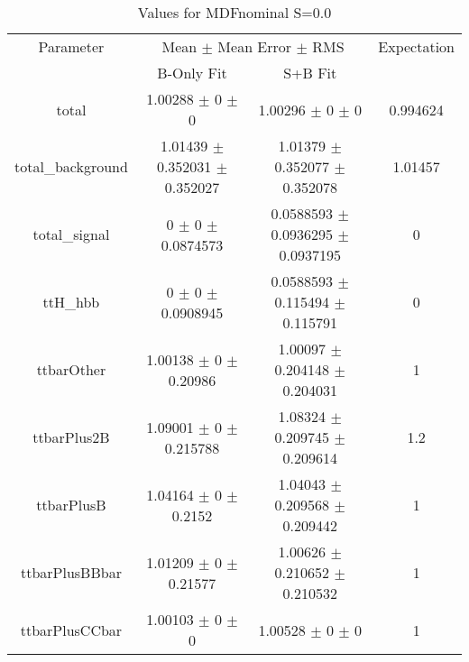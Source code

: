 \begin{table}
\centering
\caption{Values for MDFnominal S=0.0}
\begin{tabular}{cccc}
\toprule
Parameter & \multicolumn{2}{c}{Mean $\pm$ Mean Error $\pm$ RMS} & Expectation\\
 & B-Only Fit & S+B Fit & \\
\midrule
total & \num{1.00288} $\pm$ \num{0} $\pm$ \num{0} & \num{1.00296} $\pm$ \num{0} $\pm$ \num{0} & \num{0.994624}\\
total\_background & \num{1.01439} $\pm$ \num{0.352031} $\pm$ \num{0.352027} & \num{1.01379} $\pm$ \num{0.352077} $\pm$ \num{0.352078} & \num{1.01457}\\
total\_signal & \num{0} $\pm$ \num{0} $\pm$ \num{0.0874573} & \num{0.0588593} $\pm$ \num{0.0936295} $\pm$ \num{0.0937195} & \num{0}\\
ttH\_hbb & \num{0} $\pm$ \num{0} $\pm$ \num{0.0908945} & \num{0.0588593} $\pm$ \num{0.115494} $\pm$ \num{0.115791} & \num{0}\\
ttbarOther & \num{1.00138} $\pm$ \num{0} $\pm$ \num{0.20986} & \num{1.00097} $\pm$ \num{0.204148} $\pm$ \num{0.204031} & \num{1}\\
ttbarPlus2B & \num{1.09001} $\pm$ \num{0} $\pm$ \num{0.215788} & \num{1.08324} $\pm$ \num{0.209745} $\pm$ \num{0.209614} & \num{1.2}\\
ttbarPlusB & \num{1.04164} $\pm$ \num{0} $\pm$ \num{0.2152} & \num{1.04043} $\pm$ \num{0.209568} $\pm$ \num{0.209442} & \num{1}\\
ttbarPlusBBbar & \num{1.01209} $\pm$ \num{0} $\pm$ \num{0.21577} & \num{1.00626} $\pm$ \num{0.210652} $\pm$ \num{0.210532} & \num{1}\\
ttbarPlusCCbar & \num{1.00103} $\pm$ \num{0} $\pm$ \num{0} & \num{1.00528} $\pm$ \num{0} $\pm$ \num{0} & \num{1}\\
\bottomrule
\end{tabular}
\end{table}
